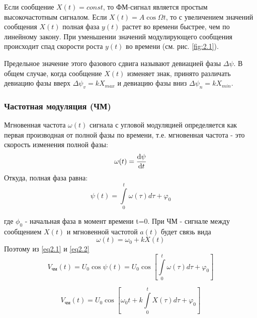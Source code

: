 Если сообщение $X(t)=const$, то ФМ-сигнал является простым высокочастотным сигналом.
Если $X(t)=A\cos\Omega t$, то с увеличением значений сообщения $X(t)$ полная фаза $y(t)$ растет во времени быстрее, чем по линейному закону. При уменьшении значений модулирующего сообщения происходит спад скорости роста $y(t)$ во времени (см. рис. \ref{fig:2.1}).



Предельное значение этого фазового сдвига называют девиацией фазы $\Delta \psi$. В общем случае, когда сообщение $X(t)$ изменяет знак, принято различать девиацию фазы вверх $\Delta \psi_v =kX_{max}$ и девиацию фазы вниз $\Delta \psi_n =kX_{min}$.

\subsubsection{Частотная модуляция (ЧМ)}
Мгновенная частота $\omega(t)$ сигнала с угловой модуляцией определяется как первая производная от полной фазы по времени, т.е. мгновенная частота - это скорость изменения полной фазы:
\begin{gather}
	\omega (t)=\dv{\psi}{t}
\end{gather}
Откуда, полная фаза равна:
\begin{equation}
	\label{eq2.1}
	\psi(t)=\int\limits_{0}^{t} \omega(\tau) d \tau+\varphi_{0}
\end{equation}

где $\phi_0$ - начальная фаза в момент времени t=0.
При ЧМ - сигнале между сообщением $X(t)$ и мгновенной частотой $a(t)$ будет связь
вида
\begin{equation}
	\label{eq2.2}
	\omega(t)=\omega_{0}+k X(t)
\end{equation}
Поэтому из \eqref{eq2.1} и \eqref{eq2.2}
\begin{equation}
	V_\text{чм}(t)=U_{0} \cos \psi(t)=U_{0} \cos \left[\int\limits_{0}^{t} \omega(\tau) d \tau+\varphi_{0}\right]
\end{equation}


\begin{equation}
	V_\text{чм}(t)=U_{0} \cos \left[\omega_{0} t+k \int\limits_{0}^{t} X(\tau) d \tau+\varphi_{0}\right]
\end{equation}


